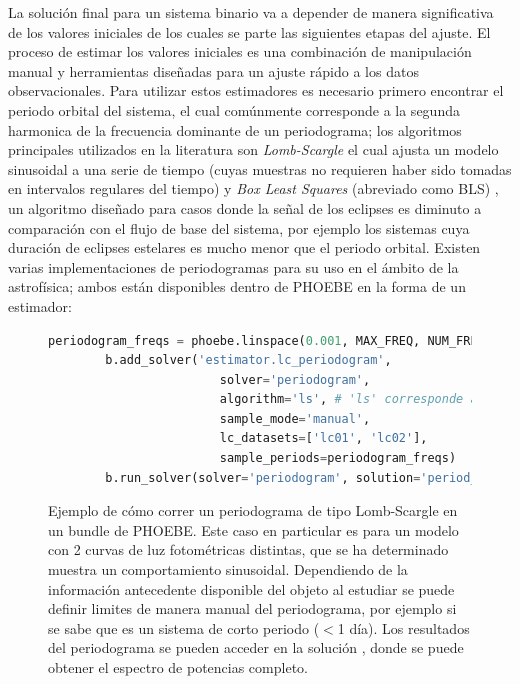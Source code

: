 La solución final para un sistema binario va a depender de manera significativa
de los valores iniciales de los cuales se parte las siguientes etapas del
ajuste. El proceso de estimar los valores iniciales es una combinación de
manipulación manual y herramientas diseñadas para un ajuste rápido a los datos
observacionales. Para utilizar estos estimadores es necesario primero encontrar
el periodo orbital del sistema, el cual comúnmente corresponde a la segunda
harmonica de la frecuencia dominante de un periodograma; los algoritmos
principales utilizados en la literatura son \textit{Lomb-Scargle}
\autocite{vanderplas_understanding_lomb_scargle_periodogram_2018} el cual ajusta
un modelo sinusoidal a una serie de tiempo (cuyas muestras no requieren haber
sido tomadas en intervalos regulares del tiempo) y \textit{Box Least Squares}
(abreviado como BLS) \autocite{kovacs_bls_periodogram_periodic_transits_2002},
un algoritmo diseñado para casos donde la señal de los eclipses es diminuto a
comparación con el flujo de base del sistema, por ejemplo los sistemas cuya
duración de eclipses estelares es mucho menor que el periodo orbital. Existen
varias implementaciones de periodogramas para su uso en el ámbito de la
astrofísica; ambos están disponibles dentro de PHOEBE en la forma de un
estimador:

\begin{figure}[!ht]
	\begin{lstlisting}[language=python]
		periodogram_freqs = phoebe.linspace(0.001, MAX_FREQ, NUM_FREQS)
		b.add_solver('estimator.lc_periodogram', 
						solver='periodogram',
						algorithm='ls', # 'ls' corresponde a Lomb-Scargle, 'bls' a BLS
						sample_mode='manual',
						lc_datasets=['lc01', 'lc02'],
						sample_periods=periodogram_freqs)
		b.run_solver(solver='periodogram', solution='period_spectrum')
	\end{lstlisting}
	\caption{Ejemplo de cómo correr un periodograma de tipo
	Lomb-Scargle en un bundle de PHOEBE. Este caso en particular es para un
	modelo con 2 curvas de luz fotométricas distintas, que se ha determinado
	muestra un comportamiento sinusoidal. Dependiendo de la información
	antecedente disponible del objeto al estudiar se puede definir limites de
	manera manual del periodograma, por ejemplo si se sabe que es un sistema de
	corto periodo ($<$1 día). Los resultados del periodograma se pueden acceder en
	la solución , donde se puede obtener el espectro de
	potencias completo.}
\end{figure}

